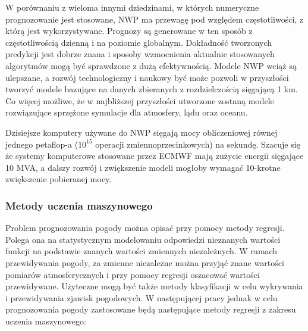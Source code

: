 W porównaniu z wieloma innymi dziedzinami, w których numeryczne prognozowanie jest stosowane,
NWP ma przewagę pod względem częstotliwości, z którą jest wykorzystywane. Prognozy są generowane
w ten sposób z częstotliwością dzienną i na poziomie globalnym. Dokładność tworzonych predykcji jest
dobrze znana i sposoby wzmocnienia aktualnie stosowanych algorytmów mogą być sprawdzone z dużą
efektywnością. Modele NWP wciąż są ulepszane, a rozwój technologiczny i naukowy być może pozwoli
w przyszłości tworzyć modele bazujące na danych zbieranych z rozdzielczością sięgającą 1 km. Co więcej
możliwe, że w najbliższej przyszłości utworzone zostaną modele rozwiązujące sprzężone symulacje
dla atmosfery, lądu oraz oceanu\cite{nwp-the-quiet-revolution}.

Dzisiejsze komputery używane do NWP sięgają mocy obliczeniowej równej jednego petaflop-a ($10^{15}$ operacji
zmiennoprzecinkowych) na sekundę. Szacuje się że systemy komputerowe stosowane przez ECMWF mają zużycie energii
sięgające 10 MVA, a dalszy rozwój i zwiększenie modeli mogłoby wymagać 10-krotne zwiększenie pobieranej mocy.

\subsubsection*{Metody uczenia maszynowego}

Problem prognozowania pogody można opisać przy pomocy metody regresji. Polega ona
na statystycznym modelowaniu odpowiedzi nieznanych wartości funkcji na podstawie
znanych wartości zmiennych niezależnych. W ramach przewidywania pogody, za zmienne niezależne
można przyjąć znane wartości pomiarów atmosferycznych i przy pomocy regresji oszacować 
wartości przewidywane. Użyteczne mogą być także metody klasyfikacji w celu wykrywania i 
przewidywania zjawisk pogodowych. W następującej pracy jednak w celu prognozowania pogody
zastosowane będą następujące metody regresji z zakresu uczenia maszynowego:


